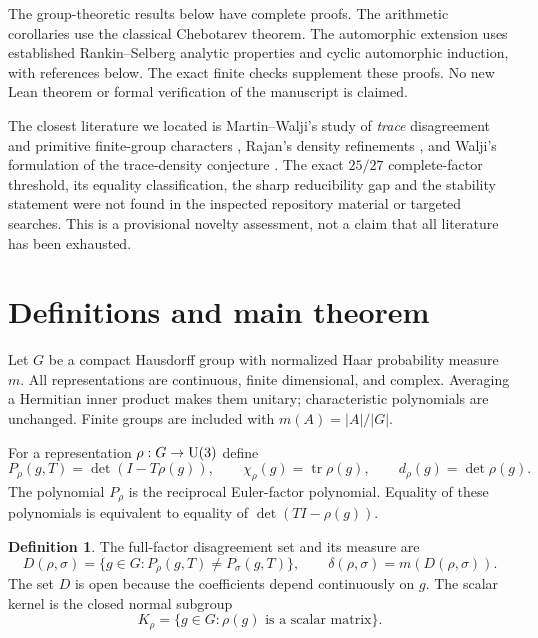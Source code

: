 \documentclass[11pt]{article}
\theoremstyle{definition}\newtheorem{definition}[theorem]{Definition}
\theoremstyle{remark}\newtheorem{remark}[theorem]{Remark}
\newcommand{\tr}{\operatorname{tr}}\newcommand{\Gal}{\operatorname{Gal}}\newcommand{\diag}{\operatorname{diag}}
\begin{document}
The group-theoretic results below have complete proofs. The arithmetic corollaries use the classical Chebotarev theorem. The automorphic extension uses established Rankin--Selberg analytic properties and cyclic automorphic induction, with references below. The exact finite checks supplement these proofs. No new Lean theorem or formal verification of the manuscript is claimed.

The closest literature we located is Martin--Walji's study of \emph{trace} disagreement and primitive finite-group characters \cite{MartinWalji}, Rajan's density refinements \cite{Rajan2000,Rajan2003}, and Walji's formulation of the trace-density conjecture \cite{Walji}. The exact $25/27$ complete-factor threshold, its equality classification, the sharp reducibility gap and the stability statement were not found in the inspected repository material or targeted searches. This is a provisional novelty assessment, not a claim that all literature has been exhausted.

\section{Definitions and main theorem}

Let $G$ be a compact Hausdorff group with normalized Haar probability measure $m$. All representations are continuous, finite dimensional, and complex. Averaging a Hermitian inner product makes them unitary; characteristic polynomials are unchanged. Finite groups are included with $m(A)=|A|/|G|$.

For a representation $\rho:G\to\mathrm U(3)$ define
\[
 P_\rho(g,T)=\det(I-T\rho(g)),\qquad \chi_\rho(g)=\tr\rho(g),\qquad d_\rho(g)=\det\rho(g).
\]
The polynomial $P_\rho$ is the reciprocal Euler-factor polynomial. Equality of these polynomials is equivalent to equality of $\det(TI-\rho(g))$.

\begin{definition}
The full-factor disagreement set and its measure are
\[
 D(\rho,\sigma)=\{g\in G:P_\rho(g,T)\ne P_\sigma(g,T)\},\qquad
 \delta(\rho,\sigma)=m(D(\rho,\sigma)).
\]
The set $D$ is open because the coefficients depend continuously on $g$.
The scalar kernel is the closed normal subgroup
\[
 K_\rho=\{g\in G:\rho(g)\text{ is a scalar matrix}\}.
\]
\end{definition}
\end{document}

